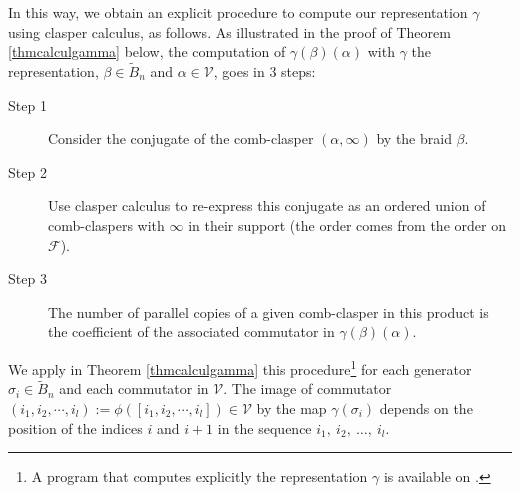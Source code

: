 \documentclass[11pt, a4paper, twoside,reqno]{amsart}
\begin{document}
In this way, we obtain an explicit procedure to compute our representation $\gamma$ using clasper calculus, as follows. As illustrated in the proof of Theorem \ref{thmcalculgamma} below, the computation of $\gamma(\beta)(\alpha)$ with $\gamma$ the representation, $\beta\in\tilde B_n$ and $\alpha\in\mathcal V$, goes in 3 steps: 
\begin{description}
    \item[Step 1] Consider the conjugate of the comb-clasper $(\alpha,\infty)$ by the braid $\beta$.
    \item[Step 2] Use clasper calculus to re-express this conjugate as an ordered union of comb-claspers with $\infty$ in their support (the order comes from the order on $\mathcal F$).
    \item[Step 3] The number of parallel copies of a given comb-clasper in this product is the coefficient of the associated commutator in $\gamma(\beta)(\alpha)$. 
\end{description} 
We apply in Theorem \ref{thmcalculgamma} this procedure\footnote{A program that computes explicitly the representation $\gamma$ is available on \cite{siteweb}.} for each generator $\sigma_i\in\tilde B_n$ and each commutator in $\mathcal V$. The image of commutator $(i_1,i_2,\cdots,i_l):=\phi([i_1,i_2,\cdots,i_l])\in\mathcal V$ by the map $\gamma(\sigma_i)$ depends on the position of the indices $i$ and $i+1$ in the sequence $i_1,\ i_2,\ \ldots,\ i_l$. 
\end{document}
